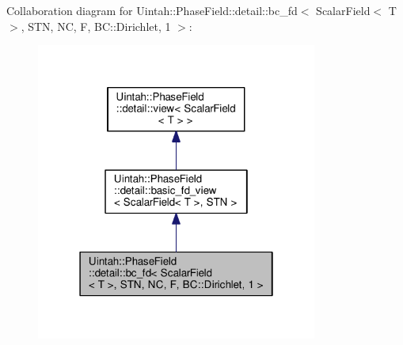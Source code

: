 Collaboration diagram for Uintah\+:\+:Phase\+Field\+:\+:detail\+:\+:bc\+\_\+fd$<$ Scalar\+Field$<$ T $>$, S\+TN, NC, F, BC\+:\+:Dirichlet, 1 $>$\+:\nopagebreak
\begin{figure}[H]
\begin{center}
\leavevmode
\includegraphics[width=262pt]{classUintah_1_1PhaseField_1_1detail_1_1bc__fd_3_01ScalarField_3_01T_01_4_00_01STN_00_01NC_00_01F75603d4fb14d6d81d1ee8ca039e798b1}
\end{center}
\end{figure}
